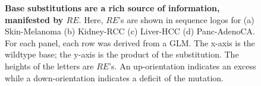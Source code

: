 \begin{figure}[htbp]
    \caption{\textbf{Base substitutions are a rich source of information, manifested by $RE$}. Here, $RE$'s are shown in sequence logos for (a) Skin-Melanoma (b) Kidney-RCC (c) Liver-HCC (d) Panc-AdenoCA. For each panel, each row was derived from a GLM. The x-axis is the wildtype base; the y-axis is the product of the substitution. The heights of the letters are $RE$'s. An up-orientation indicates an excess while a down-orientation indicates a deficit of the mutation.}
    \label{fig:spectra}
\end{figure}